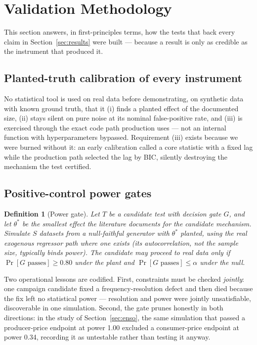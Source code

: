\documentclass[11pt]{article}
\newtheorem{definition}{Definition}
\begin{document}
\section{Validation Methodology}\label{sec:method}

This section answers, in first-principles terms, how the tests that
back every claim in Section~\ref{sec:results} were built --- because a
result is only as credible as the instrument that produced it.

\subsection{Planted-truth calibration of every instrument}

No statistical tool is used on real data before demonstrating, on
synthetic data with known ground truth, that it (i) finds a planted
effect of the documented size, (ii) stays silent on pure noise at its
nominal false-positive rate, and (iii) is exercised through the exact
code path production uses --- not an internal function with
hyperparameters bypassed. Requirement (iii) exists because we were
burned without it: an early calibration called a core statistic with a
fixed lag while the production path selected the lag by BIC, silently
destroying the mechanism the test certified.

\subsection{Positive-control power gates}\label{sec:power}

\begin{definition}[Power gate]
Let $T$ be a candidate test with decision gate $G$, and let $\theta^*$
be the smallest effect the literature documents for the candidate
mechanism. Simulate $S$ datasets from a null-faithful generator with
$\theta^*$ planted, using the \emph{real} exogenous regressor path
where one exists (its autocorrelation, not the sample size, typically
binds power). The candidate may proceed to real data only if
$\Pr[G \text{ passes}] \geq 0.80$ under the plant and
$\Pr[G \text{ passes}] \leq \alpha$ under the null.
\end{definition}

Two operational lessons are codified. First, constraints must be checked
\emph{jointly}: one campaign candidate fixed a frequency-resolution
defect and then died because the fix left no statistical power ---
resolution and power were jointly unsatisfiable, discoverable in one
simulation. Second, the gate prunes honestly in both directions: in the
study of Section~\ref{sec:enso}, the same simulation that passed a
producer-price endpoint at power 1.00 excluded a consumer-price endpoint
at power 0.34, recording it as untestable rather than testing it anyway.
\end{document}
